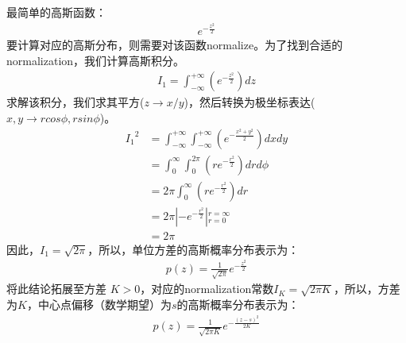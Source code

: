 最简单的高斯函数：
\begin{equation}
    \begin{split}
    e^{-\frac{z^2}{2}}
    \end{split}
\end{equation}
要计算对应的高斯分布，则需要对该函数normalize。为了找到合适的normalization，我们计算高斯积分。
\begin{equation}
    \begin{split}
    I_1 = \int_{-\infty}^{+\infty}
    \left(
        e^{-\frac{z^2}{2}}
    \right) dz
    \end{split}
\end{equation}
求解该积分，我们求其平方($z\rightarrow x/y$)，然后转换为极坐标表达($x,y\rightarrow rcos\phi, rsin\phi$)。
\begin{equation}
    \begin{split}
    {I_1}^2 &= \int_{-\infty}^{+\infty} \int_{-\infty}^{+\infty}
    \left(
        e^{-\frac{x^2+y^2}{2}}
    \right) dxdy \\
    &= \int_{0}^{\infty} \int_{0}^{2\pi}
    \left(
        r e^{-\frac{r^2}{2}} 
    \right) dr d\phi \\
    &= 2\pi \int_{0}^{\infty} 
    \left(
        r e^{-\frac{r^2}{2}} 
    \right) dr \\
    &= 2\pi \left | -e^{-\frac{r^2}{2}}\right |{}_{r=0}^{r=\infty} \\
    &= 2\pi
    \end{split}
\end{equation}
因此，$I_1=\sqrt{2\pi}$，所以，单位方差的高斯概率分布表示为：
\begin{equation}
    \begin{split}
    p(z) = \frac{1}{\sqrt{2\pi}} e^{-\frac{z^2}{2}}
    \end{split}
\end{equation}
将此结论拓展至方差 $K>0$，对应的normalization常数$I_K = \sqrt{2\pi K}$，所以，方差为$K$，中心点偏移（数学期望）为$s$的高斯概率分布表示为：
\begin{equation}
    \begin{split}
    p(z) = \frac{1}{\sqrt{2\pi K}} e^{-\frac{(z-s)^2}{2K}}
    \end{split}
\end{equation}

